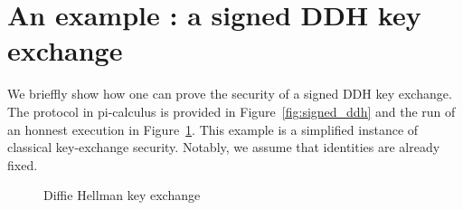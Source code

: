 \section{An example : a signed DDH key exchange}

We brieffly show how one can prove the security of a signed DDH key exchange. The protocol in pi-calculus is provided in Figure~\ref{fig:signed_ddh} and the run of an honnest execution in Figure~\ref{fig:dh_ke}. This example is a simplified instance of classical key-exchange security. Notably, we assume that identities are already fixed.

\begin{figure}
    \setmsckeyword{} 
    \begin{center}
    \begin{msc}{}
        \setlength{\instwidth}{0\mscunit}
        \setlength{\instdist}{7cm}
        \setlength{\topheaddist}{0cm}


        \nextlevel[-1]
        \nextlevel[1.5]
         \nextlevel[1.5]




       \end{msc}
       \end{center}
    \caption{Diffie Hellman key exchange}\label{fig:dh_ke}
\end{figure}


